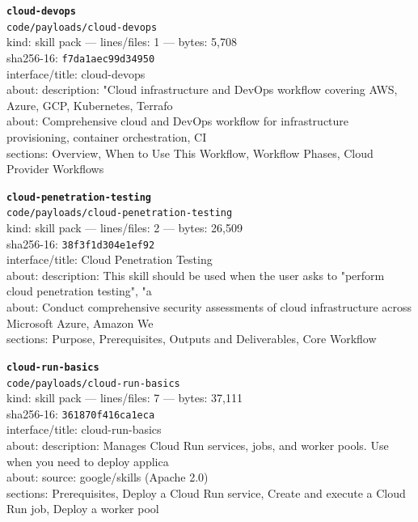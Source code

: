 \noindent\textbf{\texttt{cloud-devops}}\\
\texttt{code/payloads/cloud-devops}\\
kind: skill pack --- lines/files: 1 --- bytes: 5,708\\
sha256-16: \texttt{f7da1aec99d34950}\\
interface/title: cloud-devops\\
about: description: "Cloud infrastructure and DevOps workflow covering AWS, Azure, GCP, Kubernetes, Terrafo\\
about: Comprehensive cloud and DevOps workflow for infrastructure provisioning, container orchestration, CI\\
sections: Overview, When to Use This Workflow, Workflow Phases, Cloud Provider Workflows\\
\vspace*{6.0pt}

\noindent\textbf{\texttt{cloud-penetration-testing}}\\
\texttt{code/payloads/cloud-penetration-testing}\\
kind: skill pack --- lines/files: 2 --- bytes: 26,509\\
sha256-16: \texttt{38f3f1d304e1ef92}\\
interface/title: Cloud Penetration Testing\\
about: description: This skill should be used when the user asks to "perform cloud penetration testing", "a\\
about: Conduct comprehensive security assessments of cloud infrastructure across Microsoft Azure, Amazon We\\
sections: Purpose, Prerequisites, Outputs and Deliverables, Core Workflow\\
\vspace*{6.0pt}
\newpage

\noindent\textbf{\texttt{cloud-run-basics}}\\
\texttt{code/payloads/cloud-run-basics}\\
kind: skill pack --- lines/files: 7 --- bytes: 37,111\\
sha256-16: \texttt{361870f416ca1eca}\\
interface/title: cloud-run-basics\\
about: description: Manages Cloud Run services, jobs, and worker pools. Use when you need to deploy applica\\
about: source: google/skills (Apache 2.0)\\
sections: Prerequisites, Deploy a Cloud Run service, Create and execute a Cloud Run job, Deploy a worker pool\\
\vspace*{6.0pt}

